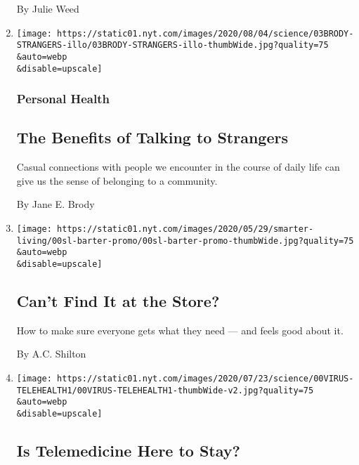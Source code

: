\begin{enumerate}
  By Julie Weed
\item
  \href{/2020/08/03/well/family/the-benefits-of-talking-to-strangers.html}{}

  \texttt{[image: https://static01.nyt.com/images/2020/08/04/science/03BRODY-STRANGERS-illo/03BRODY-STRANGERS-illo-thumbWide.jpg?quality=75\\\&auto=webp\\\&disable=upscale]}

  \hypertarget{personal-health}{%
  \subsubsection{Personal Health}\label{personal-health}}

  \hypertarget{the-benefits-of-talking-to-strangers}{%
  \subsection{The Benefits of Talking to
  Strangers}\label{the-benefits-of-talking-to-strangers}}

  Casual connections with people we encounter in the course of daily
  life can give us the sense of belonging to a community.

  By Jane E. Brody
\item
  \href{/2020/08/03/smarter-living/coronavirus-how-to-trade-barter.html}{}

  \texttt{[image: https://static01.nyt.com/images/2020/05/29/smarter-living/00sl-barter-promo/00sl-barter-promo-thumbWide.jpg?quality=75\\\&auto=webp\\\&disable=upscale]}

  \hypertarget{cant-find-it-at-the-store}{%
  \subsection{Can't Find It at the
  Store?}\label{cant-find-it-at-the-store}}

  How to make sure everyone gets what they need --- and feels good about
  it.

  By A.C. Shilton
\item
  \href{/2020/08/03/health/covid-telemedicine-congress.html}{}

  \texttt{[image: https://static01.nyt.com/images/2020/07/23/science/00VIRUS-TELEHEALTH1/00VIRUS-TELEHEALTH1-thumbWide-v2.jpg?quality=75\\\&auto=webp\\\&disable=upscale]}

  \hypertarget{is-telemedicine-here-to-stay}{%
  \subsection{Is Telemedicine Here to
  Stay?}\label{is-telemedicine-here-to-stay}}


\end{enumerate}
